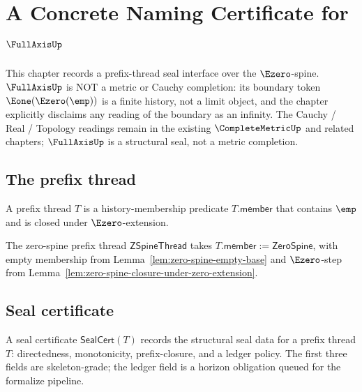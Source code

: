 \chapter{A Concrete Naming Certificate for \(\FullAxisUp\)}
\label{ch:concrete-instances-full-axis-seal-namecert}

This chapter records a prefix-thread seal interface over the \(\Ezero\)-spine. \(\FullAxisUp\) is NOT a metric or Cauchy completion: its boundary token \(\Eone(\Ezero(\emp))\) is a finite history, not a limit object, and the chapter explicitly disclaims any reading of the boundary as an infinity. The Cauchy / Real / Topology readings remain in the existing \(\CompleteMetricUp\) and related chapters; \(\FullAxisUp\) is a structural seal, not a metric completion.

\section{The prefix thread}

\begin{definition}
\label{def:prefix-thread}
A prefix thread \(T\) is a history-membership predicate \(T.\mathsf{member}\) that contains \(\emp\) and is closed under \(\Ezero\)-extension.
\end{definition}

\begin{definition}
\label{def:zero-spine-prefix-thread}
The zero-spine prefix thread \(\mathsf{ZSpineThread}\) takes \(T.\mathsf{member} := \mathsf{ZeroSpine}\), with empty membership from Lemma~\ref{lem:zero-spine-empty-base} and \(\Ezero\)-step from Lemma~\ref{lem:zero-spine-closure-under-zero-extension}.
\end{definition}

\section{Seal certificate}

\begin{definition}
\label{def:seal-certificate}
A seal certificate \(\mathsf{SealCert}(T)\) records the structural seal data for a prefix thread \(T\): directedness, monotonicity, prefix-closure, and a ledger policy. The first three fields are skeleton-grade; the ledger field is a horizon obligation queued for the formalize pipeline.
\end{definition}

